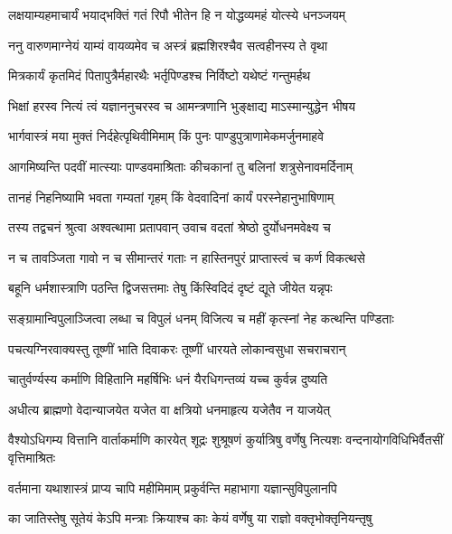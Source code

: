 


\twolineshloka
{लक्षयाम्यहमाचार्यं भयाद्भक्तिं गतं रिपौ}
{भीतेन हि न योद्धव्यमहं योत्स्ये धनञ्जयम्}


\twolineshloka
{ननु वारुणमाग्नेयं याम्यं वायव्यमेव च}
{अस्त्रं ब्रह्मशिरश्चैव सत्वहीनस्य ते वृथा}


\twolineshloka
{मित्रकार्यं कृतमिदं पितापुत्रैर्महारथैः}
{भर्तृपिण्डश्च निर्विष्टो यथेष्टं गन्तुमर्हथ}


\twolineshloka
{भिक्षां हरस्व नित्यं त्वं यज्ञाननुचरस्व च}
{आमन्त्रणानि भुङ्क्षाद्य माऽस्मान्युद्धेन भीषय}


\twolineshloka
{भार्गवास्त्रं मया मुक्तं निर्दहेत्पृथिवीमिमाम्}
{किं पुनः पाण्डुपुत्राणामेकमर्जुनमाहवे}


\twolineshloka
{आगमिष्यन्ति पदवीं मात्स्याः पाण्डवमाश्रिताः}
{कीचकानां तु बलिनां शत्रुसेनावमर्दिनाम्}


\twolineshloka
{तानहं निहनिष्यामि भवता गम्यतां गृहम्}
{किं वेदवादिनां कार्यं परस्नेहानुभाषिणाम्}


\twolineshloka
{तस्य तद्वचनं श्रुत्वा अश्वत्थामा प्रतापवान्}
{उवाच वदतां श्रेष्ठो दुर्योधनमवेक्ष्य च}


\twolineshloka
{न च तावञ्जिता गावो न च सीमान्तरं गताः}
{न हास्तिनपुरं प्राप्तास्त्वं च कर्ण विकत्थसे}


\twolineshloka
{बहूनि धर्मशास्त्राणि पठन्ति द्विजसत्तमाः}
{तेषु किंस्विदिदं दृष्टं द्यूते जीयेत यन्नृपः}


\twolineshloka
{सङ्ग्रामान्विपुलाञ्जित्वा लब्धा च विपुलं धनम्}
{विजित्य च महीं कृत्स्नां नेह कत्थन्ति पण्डिताः}


\twolineshloka
{पचत्यग्निरवाक्यस्तु तूष्णीं भाति दिवाकरः}
{तूष्णीं धारयते लोकान्वसुधा सचराचरान्}


\twolineshloka
{चातुर्वर्ण्यस्य कर्माणि विहितानि महर्षिभिः}
{धनं यैरधिगन्तव्यं यच्च कुर्वन्न दुष्यति}


\twolineshloka
{अधीत्य ब्राह्मणो वेदान्याजयेत यजेत वा}
{क्षत्रियो धनमाहृत्य यजेतैव न याजयेत्}


\onelineshloka
{वैश्योऽधिगम्य वित्तानि वार्ताकर्माणि कारयेत्}
\twolineshloka
{शूद्रः शुश्रूषणं कुर्यात्रिषु वर्णेषु नित्यशः}
{वन्दनायोगविधिभिर्वैतसीं वृत्तिमाश्रितः}


\twolineshloka
{वर्तमाना यथाशास्त्रं प्राप्य चापि महीमिमाम्}
{प्रकुर्वन्ति महाभागा यज्ञान्सुविपुलानपि}


\twolineshloka
{का जातिस्तेषु सूतेयं केऽपि मन्त्राः क्रियाश्च काः}
{केयं वर्णेषु या राज्ञो वक्तृभोक्तृनियन्तृषु}


